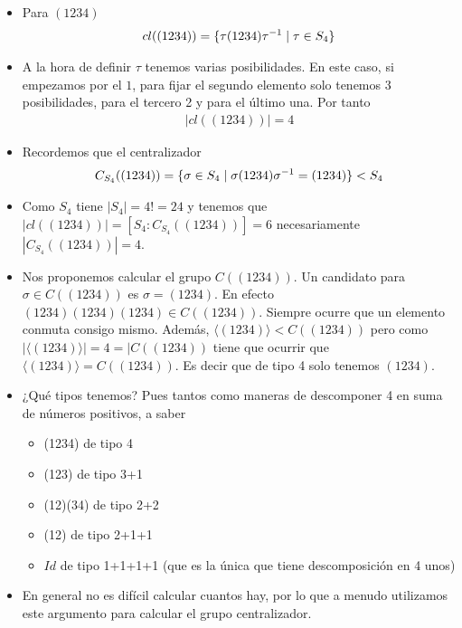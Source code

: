 \begin{ej}
	\begin{itemize}
		\item Para $(1234)$
		\begin{align*}
		cl((1234)) = \{\tau(1234)\tau^{-1} \mid \tau \in S_4\}
		\end{align*}
		\item A la hora de definir $\tau$ tenemos varias posibilidades. En este caso, si empezamos por el $1$, para fijar el segundo elemento solo tenemos 3 posibilidades, para el tercero 2 y para el último una. Por tanto
		\begin{align*}
		|cl((1234))| = 4
		\end{align*}
		
		\item Recordemos que el centralizador
		\begin{align*}
		C_{S_4}((1234)) = \{\sigma \in S_4 \mid \sigma (1234) \sigma^{-1} = (1234)\} < S_4
		\end{align*}
		
		\item Como $S_4$ tiene $|S_4| = 4! = 24$ y tenemos que $|cl((1234))| = [S_4 : C_{S_4}((1234))] = 6$ necesariamente $|C_{S_4}((1234))| = 4$.
		
		\item Nos proponemos calcular el grupo $C((1234))$. Un candidato para $\sigma \in C((1234))$ es $\sigma = (1234)$. En efecto $(1234)(1234)(1234) \in C((1234))$. Siempre ocurre que un elemento conmuta consigo mismo. Además, $\langle (1234) \rangle < C((1234))$ pero como $|\langle (1234) \rangle| = 4 = |C((1234))$ tiene que ocurrir que $\langle (1234) \rangle = C((1234))$. Es decir que de tipo 4 solo tenemos $(1234)$.
		
		\item ¿Qué tipos tenemos? Pues tantos como maneras de descomponer 4 en suma de números positivos, a saber
		\begin{itemize}
			\item (1234) de tipo 4
			\item (123) de tipo 3+1
			\item (12)(34) de tipo 2+2
			\item (12) de tipo 2+1+1
			\item $Id$ de tipo 1+1+1+1 (que es la única que tiene descomposición en 4 unos)
		\end{itemize}
		
		\item En general no es difícil calcular cuantos hay, por lo que a menudo utilizamos este argumento para calcular el grupo centralizador.
		

\end{itemize}
\end{ej}
